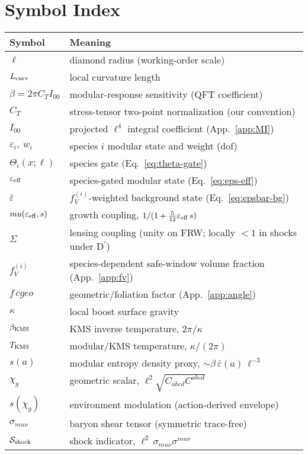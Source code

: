 \documentclass[aps,prd,onecolumn,superscriptaddress,nofootinbib]{revtex4-2}
\def\cgeo{cgeo}%
\def\mu{mu}%
\providecommand{\cgeo}{c_{\rm geo}}
\begin{document}
\section*{Symbol Index}
\begin{tabular}{@{}ll@{}}
\toprule
Symbol & Meaning \\
\midrule
\(\ell\) & diamond radius (working-order scale) \\
\(L_{\rm curv}\) & local curvature length \\
\(\beta=2\pi C_T I_{00}\) & modular-response sensitivity (QFT coefficient) \\
\(C_T\) & stress-tensor two-point normalization (our convention) \\
\(I_{00}\) & projected \(\ell^4\) integral coefficient (App.~\ref{app:MI}) \\
\(\varepsilon_i,\ w_i\) & species \(i\) modular state and weight (dof) \\
\(\Theta_i(x;\ell)\) & species gate (Eq.~\ref{eq:theta-gate}) \\
\(\varepsilon_{\rm eff}\) & species-gated modular state (Eq.~\ref{eq:eps-eff}) \\
\(\bar\varepsilon\) & \(f_V^{(i)}\)-weighted background state (Eq.~\ref{eq:epsbar-bg}) \\
\(\mu(\varepsilon_{\rm eff},s)\) & growth coupling, \(1/(1+\tfrac{5}{12}\varepsilon_{\rm eff}\,s)\) \\
\(\Sigma\) & lensing coupling (unity on FRW; locally $<\!1$ in shocks under D\(^{\prime}\)) \\
\(f_V^{(i)}\) & species-dependent safe-window volume fraction (App.~\ref{app:fv}) \\
\(f\,\cgeo\) & geometric/foliation factor (App.~\ref{app:angle}) \\
\(\kappa\) & local boost surface gravity \\
\(\beta_{\rm KMS}\) & KMS inverse temperature, \(2\pi/\kappa\) \\
\(T_{\rm KMS}\) & modular/KMS temperature, \(\kappa/(2\pi)\) \\
\(s(a)\) & modular entropy density proxy, \(\sim \beta\,\bar\varepsilon(a)\,\ell^{-3}\) \\
\(\chi_g\) & geometric scalar, \(\ell^2\sqrt{C_{abcd}C^{abcd}}\) \\
\(s(\chi_g)\) & environment modulation (action-derived envelope) \\
\(\sigma_{\mu\nu}\) & baryon shear tensor (symmetric trace-free) \\
\(\mathcal S_{\rm shock}\) & shock indicator, \(\ell^2\,\sigma_{\mu\nu}\sigma^{\mu\nu}\) \\

\end{tabular}
\end{document}
